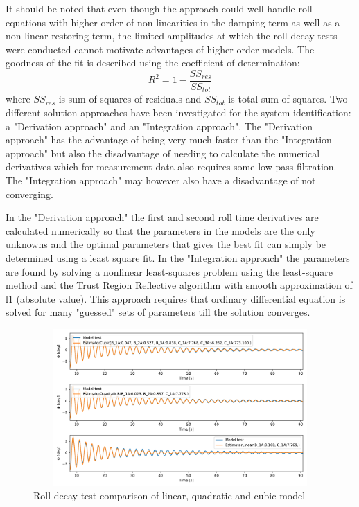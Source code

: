 It should be noted that even though the approach could well handle roll equations with higher order of non-linearities in the damping term as well as a non-linear restoring term, the limited amplitudes at which the roll decay tests were conducted cannot motivate advantages of higher order models. 
The goodness of the fit is described using the coefficient of determination:
\begin{equation} \label{eq:R2}
R^2=1-\frac{SS_{res}}{SS_{tot}}
\end{equation}
where $SS_{res}$ is sum of squares of residuals and $SS_{tot}$ is total sum of squares. Two different solution approaches have been investigated for the system identification: a "Derivation approach" and an "Integration approach". 
The "Derivation approach" has the advantage of being very much faster than the "Integration approach" but also the disadvantage of needing to calculate the numerical derivatives which for measurement data also requires some low pass filtration. The "Integration approach" may however also have a disadvantage of not converging.



In the "Derivation approach" the first and second roll time derivatives are calculated numerically so that the parameters in the models are the only unknowns and the optimal parameters that gives the best fit can simply be determined using a least square fit.
In the "Integration approach" the parameters are found by solving a nonlinear least-squares problem using the least-square method \parencite{noauthor_scipyoptimizeleast_squares_nodate} and the Trust Region Reflective algorithm with smooth approximation of l1 (absolute value). This approach requires that ordinary differential equation is solved for many "guessed" sets of parameters till the solution converges.

\begin{figure}[H]
    \centering
    \includegraphics[width=12cm, height = 6cm ]{figures/roll_decay_model_compare.pdf}
    \caption{Roll decay test comparison of linear, quadratic and cubic model}
    \label{fig:roll_decay_model_compare}
\end{figure}

